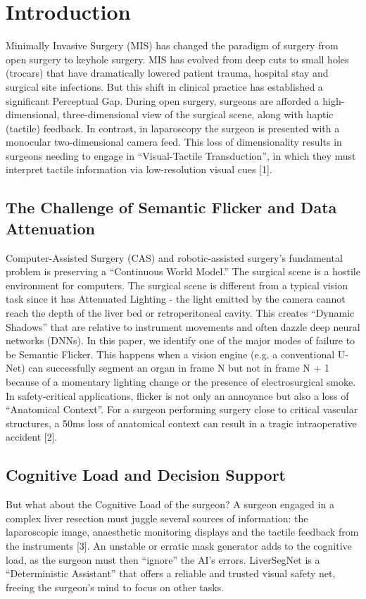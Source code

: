 \documentclass[conference]{IEEEtran}
\begin{document}
\section{Introduction}
Minimally Invasive Surgery (MIS) has changed the paradigm of surgery from open surgery to keyhole surgery. MIS has evolved from deep cuts to small holes (trocars) that have dramatically lowered patient trauma, hospital stay and surgical site infections. But this shift in clinical practice has established a significant Perceptual Gap. During open surgery, surgeons are afforded a high-dimensional, three-dimensional view of the surgical scene, along with haptic (tactile) feedback. In contrast, in laparoscopy the surgeon is presented with a monocular two-dimensional camera feed. This loss of dimensionality results in surgeons needing to engage in ``Visual-Tactile Transduction'', in which they must interpret tactile information via low-resolution visual cues [1].

\subsection{The Challenge of Semantic Flicker and Data Attenuation}
Computer-Assisted Surgery (CAS) and robotic-assisted surgery's fundamental problem is preserving a ``Continuous World Model.'' The surgical scene is a hostile environment for computers. The surgical scene is different from a typical vision task since it has Attenuated Lighting - the light emitted by the camera cannot reach the depth of the liver bed or retroperitoneal cavity. This creates ``Dynamic Shadows'' that are relative to instrument movements and often dazzle deep neural networks (DNNs). In this paper, we identify one of the major modes of failure to be Semantic Flicker. This happens when a vision engine (e.g. a conventional U-Net) can successfully segment an organ in frame N but not in frame N + 1 because of a momentary lighting change or the presence of electrosurgical smoke. In safety-critical applications, flicker is not only an annoyance but also a loss of ``Anatomical Context''. For a surgeon performing surgery close to critical vascular structures, a 50ms loss of anatomical context can result in a tragic intraoperative accident [2].

\subsection{Cognitive Load and Decision Support}
But what about the Cognitive Load of the surgeon? A surgeon engaged in a complex liver resection must juggle several sources of information: the laparoscopic image, anaesthetic monitoring displays and the tactile feedback from the instruments [3]. An unstable or erratic mask generator adds to the cognitive load, as the surgeon must then ``ignore'' the AI's errors. LiverSegNet is a ``Deterministic Assistant'' that offers a reliable and trusted visual safety net, freeing the surgeon's mind to focus on other tasks.
\end{document}
